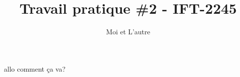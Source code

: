 \documentclass[11pt]{article}
\title{Travail pratique \#2 - IFT-2245}
\author{Moi et L'autre}
\begin{document}
\maketitle

allo comment ça va?
\end{document}
